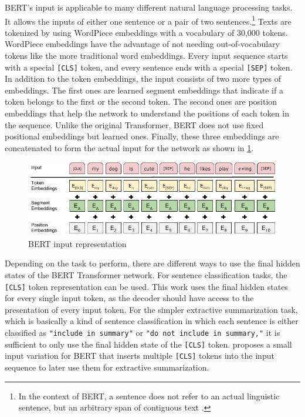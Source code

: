 BERT's input is applicable to many different natural language processing tasks.
It allows the inputs of either one sentence or a pair of two sentences.\footnote{In the context of BERT, a sentence does not refer to an actual linguistic sentence, but an arbitrary span of contiguous text \cite[p.~4]{devlin2018bert}.}
Texts are tokenized by using WordPiece embeddings with a vocabulary of 30,000 tokens. 
WordPiece embeddings have the advantage of not needing out-of-vocabulary tokens like the more traditional word embeddings.
Every input sequence starts with a special \texttt{[CLS]} token, and every sentence ends with a special \texttt{[SEP]} token.
In addition to the token embeddings, the input consists of two more types of embeddings.
The first ones are learned segment embeddings that indicate if a token belongs to the first or the second token.
The second ones are position embeddings that help the network to understand the positions of each token in the sequence.
Unlike the original Transformer, BERT does not use fixed positional embeddings but learned ones.
Finally, these three embeddings are concatenated to form the actual input for the network as shown in \cref{fig:bert-input-representation}.

\begin{figure}[h]
\centering
\includegraphics{figures/bert-input-representation}
\caption[BERT input representation]{BERT input representation \cite[p.~5]{devlin2018bert}}
\label{fig:bert-input-representation}
\end{figure}

Depending on the task to perform, there are different ways to use the final hidden states of the BERT Transformer network.
For sentence classification tasks, the \texttt{[CLS]} token representation can be used.
This work uses the final hidden states for every single input token, as the decoder should have access to the presentation of every input token.
For the simpler extractive summarization task, which is basically a kind of sentence classification in which each sentence is either classified as \texttt{"include in summary"} or \texttt{"do not include in summary,"} it is sufficient to only use the final hidden state of the \texttt{[CLS]} token. 
\cite{1903.10318} proposes a small input variation for BERT that inserts multiple \texttt{[CLS]} tokens into the input sequence to later use them for extractive summarization.

